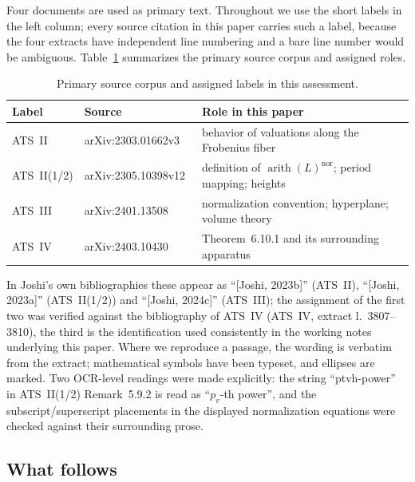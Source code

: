 \documentclass[11pt,a4paper]{article}
\theoremstyle{definition}
\theoremstyle{plain}
\theoremstyle{definition}
\newcommand{\arith}{\operatorname{arith}}
\newcommand{\anchor}[2]{(#1, extract l.~#2)}
\begin{document}
Four documents are used as primary text. Throughout we use the short labels in
the left column; every source citation in this paper carries such a label,
because the four extracts have independent line numbering and a bare line number
would be ambiguous. Table~\ref{tab:sources} summarizes the primary source corpus and assigned roles.

\begin{table}[htbp]
\centering
\caption{Primary source corpus and assigned labels in this assessment.}
\label{tab:sources}
\small
\begin{tabular}{@{}lll@{}}
\toprule
Label & Source & Role in this paper \\
\midrule
ATS~II & arXiv:2303.01662v3~\cite{JoshiATSII}
  & behavior of valuations along the Frobenius fiber \\
ATS~II(1/2) & arXiv:2305.10398v12~\cite{JoshiATSIIhalf}
  & definition of $\arith(L)^{\mathrm{nor}}$; period mapping; heights \\
ATS~III & arXiv:2401.13508~\cite{JoshiATSIII}
  & normalization convention; hyperplane; volume theory \\
ATS~IV & arXiv:2403.10430~\cite{JoshiATSIV}
  & Theorem~6.10.1 and its surrounding apparatus \\
\bottomrule
\end{tabular}
\end{table}

In Joshi's own bibliographies these appear as ``[Joshi, 2023b]'' (ATS~II),
``[Joshi, 2023a]'' (ATS~II(1/2)) and ``[Joshi, 2024c]'' (ATS~III); the assignment
of the first two was verified against the bibliography of ATS~IV
\anchor{ATS~IV}{3807--3810}, the third is the identification used consistently in
the working notes underlying this paper. Where we reproduce a passage, the wording
is verbatim from the extract; mathematical symbols have been typeset, and
ellipses are marked. Two OCR-level readings were made explicitly: the string
``ptvh-power'' in ATS~II(1/2) Remark~5.9.2 is read as ``$p_v$-th power'', and the
subscript/superscript placements in the displayed normalization equations were
checked against their surrounding prose.

\subsection{What follows}
\end{document}
